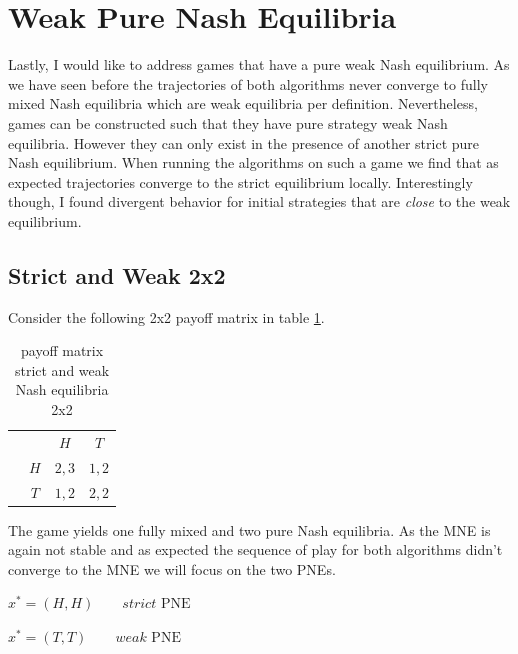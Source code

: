 \section{Weak Pure Nash Equilibria}\label{section:WeakPureNashEquilibria}

Lastly, I would like to address games that have a pure weak Nash equilibrium. As we have seen before the trajectories of both algorithms never converge to fully mixed Nash equilibria which are weak equilibria per definition. Nevertheless, games can be constructed such that they have pure strategy weak Nash equilibria. However they can only exist in the presence of another strict pure Nash equilibrium. When running the algorithms on such a game we find that as expected trajectories converge to the strict equilibrium locally. Interestingly though, I found divergent behavior for initial strategies that are \textit{close} to the weak equilibrium. 

\subsection{Strict and Weak 2x2}\label{subsection:StrictAndWeak2x2}

Consider the following 2x2 payoff matrix in table \ref{tab:payoffStrictAndWeak2x2}.

\begin{table}[H]\centering
\setlength{\extrarowheight}{2pt}
\begin{tabular}{cc|c|c|}
  & \multicolumn{1}{c}{} & \multicolumn{1}{c}{$H$}  & \multicolumn{1}{c}{$T$} \\\cline{3-4}
  & $H$ & $2,3$ & $1,2$ \\\cline{3-4}
  & $T$ & $1,2$ & $2,2$ \\\cline{3-4}
\end{tabular}\caption{\label{tab:payoffStrictAndWeak2x2}payoff matrix strict and weak Nash equilibria 2x2}
\end{table}

The game yields one fully mixed and two pure Nash equilibria. As the MNE is again not stable and as expected the sequence of play for both algorithms didn't converge to the MNE we will focus on the two PNEs. 

\begin{description}\centering
    \item $x^{*} = (H,H) \qquad \textit{strict }\text{PNE}$
    \item $x^{*} = (T,T) \qquad \textit{weak }\text{PNE}$
\end{description}

